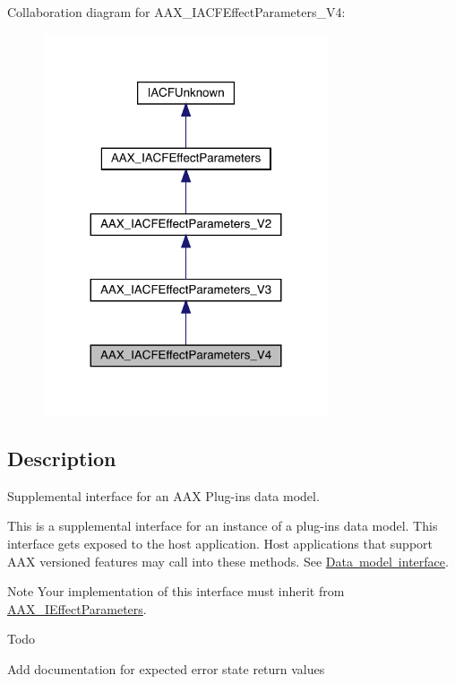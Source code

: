 Collaboration diagram for A\+A\+X\+\_\+\+I\+A\+C\+F\+Effect\+Parameters\+\_\+\+V4\+:
\nopagebreak
\begin{figure}[H]
\begin{center}
\leavevmode
\includegraphics[width=239pt]{a01683}
\end{center}
\end{figure}


\subsection{Description}
Supplemental interface for an A\+AX Plug-\/in\textquotesingle{}s data model. 

This is a supplemental interface for an instance of a plug-\/in\textquotesingle{}s data model. This interface gets exposed to the host application. Host applications that support A\+AX versioned features may call into these methods. See \mbox{\hyperlink{a00798}{Data model interface}}.

\begin{DoxyNote}{Note}
Your implementation of this interface must inherit from \mbox{\hyperlink{a01825}{A\+A\+X\+\_\+\+I\+Effect\+Parameters}}.
\end{DoxyNote}
\begin{DoxyRefDesc}{Todo}
\item[\mbox{\hyperlink{a00785__todo000034}{Todo}}]Add documentation for expected error state return values\end{DoxyRefDesc}
